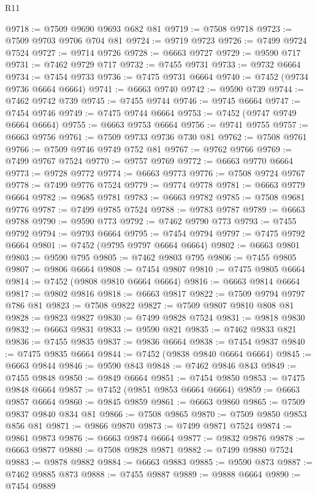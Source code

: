 \begin{lexlean}{R11}
\begin{coremodule}
{{{{{{{{{{{{{{{{{{{{{{{{{{{{{{{{{{{{{{{{{{{{{{{{{{{{{{{{{{{{{{{{{{{{{{{{{{{{{{{{{{@9718 := @7509 @9690 @9693 @682 @81
@9719 := @7508 @9718
@9723 := @7509 @9703 @9706 @704 @81
@9724 := @9719 @9723
@9726 := @7499 @9724 @7524
@9727 := @9714 @9726
@9728 := @6663 @9727
@9729 := @9590 @717
@9731 := @7462 @9729 @717
@9732 := @7455 @9731
@9733 := @9732 @6664
@9734 := @7454 @9733
@9736 := @7475 @9731 @6664
@9740 := @7452 (@9734 @9736 @6664 @6664)
@9741 := @6663 @9740
@9742 := @9590 @739
@9744 := @7462 @9742 @739
@9745 := @7455 @9744
@9746 := @9745 @6664
@9747 := @7454 @9746
@9749 := @7475 @9744 @6664
@9753 := @7452 (@9747 @9749 @6664 @6664)
@9755 := @6663 @9753 @6664
@9756 := @9741 @9755
@9757 := @6663 @9756
@9761 := @7509 @9733 @9736 @730 @81
@9762 := @7508 @9761
@9766 := @7509 @9746 @9749 @752 @81
@9767 := @9762 @9766
@9769 := @7499 @9767 @7524
@9770 := @9757 @9769
@9772 := @6663 @9770 @6664
@9773 := @9728 @9772
@9774 := @6663 @9773
@9776 := @7508 @9724 @9767
@9778 := @7499 @9776 @7524
@9779 := @9774 @9778
@9781 := @6663 @9779 @6664
@9782 := @9685 @9781
@9783 := @6663 @9782
@9785 := @7508 @9681 @9776
@9787 := @7499 @9785 @7524
@9788 := @9783 @9787
@9789 := @6663 @9788
@9790 := @9590 @773
@9792 := @7462 @9790 @773
@9793 := @7455 @9792
@9794 := @9793 @6664
@9795 := @7454 @9794
@9797 := @7475 @9792 @6664
@9801 := @7452 (@9795 @9797 @6664 @6664)
@9802 := @6663 @9801
@9803 := @9590 @795
@9805 := @7462 @9803 @795
@9806 := @7455 @9805
@9807 := @9806 @6664
@9808 := @7454 @9807
@9810 := @7475 @9805 @6664
@9814 := @7452 (@9808 @9810 @6664 @6664)
@9816 := @6663 @9814 @6664
@9817 := @9802 @9816
@9818 := @6663 @9817
@9822 := @7509 @9794 @9797 @786 @81
@9823 := @7508 @9822
@9827 := @7509 @9807 @9810 @808 @81
@9828 := @9823 @9827
@9830 := @7499 @9828 @7524
@9831 := @9818 @9830
@9832 := @6663 @9831
@9833 := @9590 @821
@9835 := @7462 @9833 @821
@9836 := @7455 @9835
@9837 := @9836 @6664
@9838 := @7454 @9837
@9840 := @7475 @9835 @6664
@9844 := @7452 (@9838 @9840 @6664 @6664)
@9845 := @6663 @9844
@9846 := @9590 @843
@9848 := @7462 @9846 @843
@9849 := @7455 @9848
@9850 := @9849 @6664
@9851 := @7454 @9850
@9853 := @7475 @9848 @6664
@9857 := @7452 (@9851 @9853 @6664 @6664)
@9859 := @6663 @9857 @6664
@9860 := @9845 @9859
@9861 := @6663 @9860
@9865 := @7509 @9837 @9840 @834 @81
@9866 := @7508 @9865
@9870 := @7509 @9850 @9853 @856 @81
@9871 := @9866 @9870
@9873 := @7499 @9871 @7524
@9874 := @9861 @9873
@9876 := @6663 @9874 @6664
@9877 := @9832 @9876
@9878 := @6663 @9877
@9880 := @7508 @9828 @9871
@9882 := @7499 @9880 @7524
@9883 := @9878 @9882
@9884 := @6663 @9883
@9885 := @9590 @873
@9887 := @7462 @9885 @873
@9888 := @7455 @9887
@9889 := @9888 @6664
@9890 := @7454 @9889
}}}}}}}}}}}}}}}}}}}}}}}}}}}}}}}}}}}}}}}}}}}}}}}}}}}}}}}}}}}}}}}}}}}}}}}}}}}}}}}}}}
\end{coremodule}
\end{lexlean}
